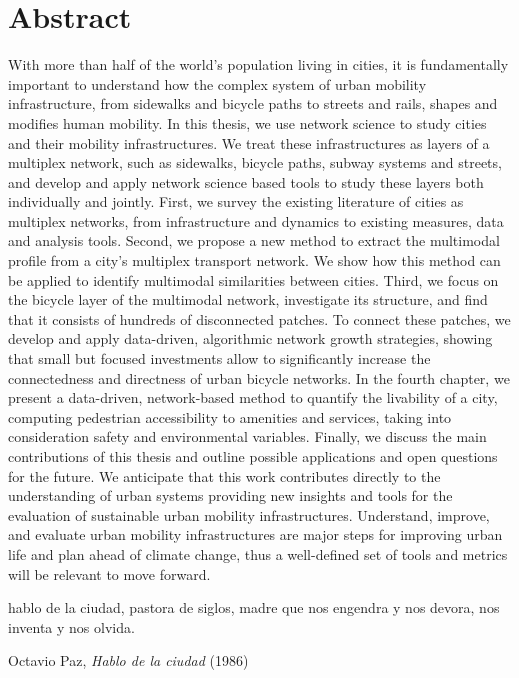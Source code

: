 \documentclass[a4paper,twoside,12pt]{book}
\begin{document}
\chapter*{Abstract}
With more than half of the world's population living in cities, it is fundamentally important to understand how the complex system of urban mobility infrastructure, from sidewalks and bicycle paths to streets and rails, shapes and modifies human mobility. In this thesis, we use network science to study cities and their mobility infrastructures. We treat these infrastructures as layers of a multiplex network, such as sidewalks, bicycle paths, subway systems and streets, and develop and apply network science based tools to study these layers both individually and jointly. First, we survey the existing literature of cities as multiplex networks, from infrastructure and dynamics to existing measures, data and analysis tools. Second, we propose a new method to extract the multimodal profile from a city's multiplex transport network. We show how this method can be applied to identify multimodal similarities between cities. Third, we focus on the bicycle layer of the multimodal network, investigate its structure, and find that it consists of hundreds of disconnected patches. To connect these patches, we develop and apply data-driven, algorithmic network growth strategies, showing that small but focused investments allow to significantly increase the connectedness and directness of urban bicycle networks. In the fourth chapter, we present a data-driven, network-based method to quantify the livability of a city, computing pedestrian accessibility to amenities and services, taking into consideration safety and environmental variables. Finally, we discuss the main contributions of this thesis and outline possible applications and open questions for the future. We anticipate that this work contributes directly to the understanding of urban systems providing new insights and tools for the evaluation of sustainable urban mobility infrastructures. Understand, improve, and evaluate urban mobility infrastructures are major steps for improving urban life and plan ahead of climate change, thus a well-defined set of tools and metrics will be relevant to move forward.

\thispagestyle{empty}

\newpage
\frontmatter
\epigraph{hablo de la ciudad, pastora de siglos, madre que nos engendra y nos devora, nos inventa y nos olvida.}{Octavio Paz, \textit{Hablo de la ciudad} (1986)}
\vfill
\thispagestyle{empty}
\end{document}
